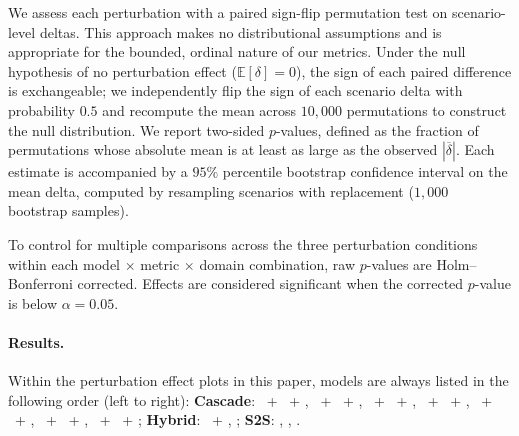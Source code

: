 We assess each perturbation with a paired sign-flip permutation test on scenario-level deltas. This approach makes no distributional assumptions and is appropriate for the bounded, ordinal nature of our metrics. Under the null hypothesis of no perturbation effect ($\mathbb{E}[\delta] = 0$), the sign of each paired difference is exchangeable; we independently flip the sign of each scenario delta with probability $0.5$ and recompute the mean across $10{,}000$ permutations to construct the null distribution. We report two-sided $p$-values, defined as the fraction of permutations whose absolute mean is at least as large as the observed $|\overline{\delta}|$. Each estimate is accompanied by a $95\%$ percentile bootstrap confidence interval on the mean delta, computed by resampling scenarios with replacement ($1{,}000$ bootstrap samples).

To control for multiple comparisons across the three perturbation conditions within each model $\times$ metric $\times$ domain combination, raw $p$-values are Holm--Bonferroni corrected. Effects are considered significant when the corrected $p$-value is below $\alpha = 0.05$.

\paragraph{Results.} Within the perturbation effect plots in this paper, models are always listed in the following order (left to right): \textbf{Cascade}: \coherefull~+ \gemmaAfull~+ \voxtralfull, \scribe~+ \geminiflashfull~+ \conversational, \inkfull~+ \haikufull~+ \sonicfull, \novafull~+ \gptfull~+ \sonicfull, \novafull~+ \gptminifull~+ \aurafull, \parakeetfull~+ \gemmaBfull~+ \kokorofull, \whisperfull~+ \qwenfull~+ \voxtralfull; \textbf{Hybrid}: \geminiflashfull~+ \geminiflashttsfull, \ultravoxfull; \textbf{S2S}: \geminilivefull, \gptrealtimefull, \gptrealtimeminifull.









